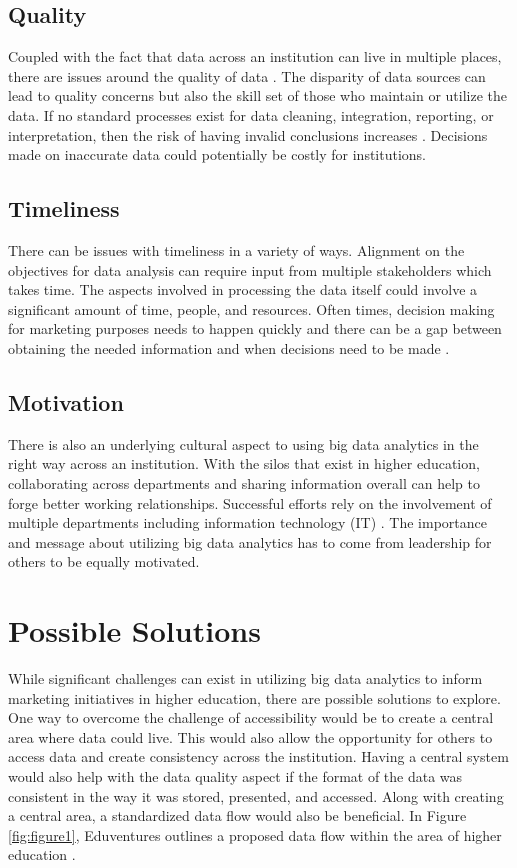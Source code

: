 \documentclass[sigconf]{acmart}
\begin{document}
\subsection{Quality}
Coupled with the fact that data across an institution can live in multiple places, there are issues around the quality of data \cite{Daniel2015}. The disparity of data sources can lead to quality concerns but also the skill set of those who maintain or utilize the data. If no standard processes exist for data cleaning, integration, reporting, or interpretation, then the risk of having invalid conclusions increases \cite{Marsh2006}. Decisions made on inaccurate data could potentially be costly for institutions. 

\subsection{Timeliness}
There can be issues with timeliness in a variety of ways. Alignment on the objectives for data analysis can require input from multiple stakeholders which takes time. The aspects involved in processing the data itself could involve a significant amount of time, people, and resources. Often times, decision making for marketing purposes needs to happen quickly and there can be a gap between obtaining the needed information and when decisions need to be made \cite{Marsh2006}. 

\subsection{Motivation}
There is also an underlying cultural aspect to using big data analytics in the right way across an institution. With the silos that exist in higher education, collaborating across departments and sharing information overall can help to forge better working relationships. Successful efforts rely on the involvement of multiple departments including information technology (IT) \cite{Daniel2015}. The importance and message about utilizing big data analytics has to come from leadership for others to be equally motivated. 


\section{Possible Solutions}

While significant challenges can exist in utilizing big data analytics to inform marketing initiatives in higher education, there are possible solutions to explore. One way to overcome the challenge of accessibility would be to create a central area where data could live. This would also allow the opportunity for others to access data and create consistency across the institution. Having a central system would also help with the data quality aspect if the format of the data was consistent in the way it was stored, presented, and accessed. Along with creating a central area, a standardized data flow would also be beneficial. In Figure \ref{fig:figure1}, Eduventures outlines a proposed data flow within the area of higher education \cite{Wiley2016}. 
\end{document}
